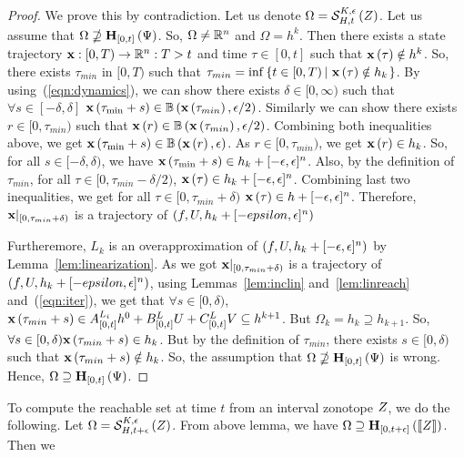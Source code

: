 \begin{proof}
We prove this by contradiction.  Let us denote $\Omega
= \mathcal{S}_{H,t}^{K,\epsilon}\left(Z\right)$.  Let us assume that
$\Omega\nsupseteq \mathbf{H}_{[0,t]}\left(\Psi\right)$.  So, $\Omega\neq\mathbb{R}^n$
and $\Omega = h^k$.  Then there exists a state trajectory
$\mathbf{x}:[0,T)\rightarrow\mathbb{R}^n:T>t$ and time $\tau\in[0,t]$ such
that $\mathbf{x}\left(\tau\right)\notin h^k$.  So, there exists $\tau_{min}$ in
$[0,T)$ such that $\tau_{min}
= \inf\left\{t\in[0,T)\left|~\mathbf{x}\left(\tau\right)\notin h_k\right.\right\}$.  By
using~(\ref{eqn:dynamics}), we can show there exists
$\delta\in[0,\infty)$ such that $\forall s\in[-\delta,\delta]$
$\mathbf{x}\left(\tau_{\min}+s\right)\in \mathbb{B}\left(\mathbf{x}\left(\tau_{min}\right),\epsilon/2\right)$.
Similarly we can show there exists $r\in[0,\tau_{min})$ such that
$\mathbf{x}\left(r\right)\in \mathbb{B}\left(\mathbf{x}\left(\tau_{min}\right),\epsilon/2\right)$.  Combining both
inequalities above, we get
$\mathbf{x}\left(\tau_{\min}+s\right)\in \mathbb{B}\left(\mathbf{x}\left(r\right),\epsilon\right)$.  As
$r\in[0,\tau_{min})$, we get $\mathbf{x}\left(r\right)\in h_k$.  So, for all
$s\in[-\delta,\delta)$, we have $\mathbf{x}\left(\tau_{\min}+s\right)\in h_k +
[-\epsilon,\epsilon]^n$.  Also, by the definition of $\tau_{min}$, for
all $\tau\in[0,\tau_{min}-\delta/2)$, $\mathbf{x}\left(\tau\right)\in h_k +
[-\epsilon,\epsilon]^n$. Combining last two inequalities, we get for
all $\tau\in[0,\tau_{min}+\delta)$ $\mathbf{x}\left(\tau\right)\in h +
[-\epsilon,\epsilon]^n$.  Therefore,
$\mathbf{x}|_{[0,\tau_{min}+\delta)}$ is a trajectory of
$\left(f,U,h_k+[-epsilon,\epsilon]^n\right)$

Furtheremore, $L_k$ is an overapproximation of
$\left(f,U,h_k+[-\epsilon,\epsilon]^n\right)$ by
Lemma~\ref{lem:linearization}.  As we got
$\mathbf{x}|_{[0,\tau_{min}+\delta)}$ is a trajectory of
$\left(f,U,h_k+[-epsilon,\epsilon]^n\right)$, using
Lemmas~\ref{lem:inclin} and~\ref{lem:linreach} and~(\ref{eqn:iter}),
we get that $\forall s\in [0,\delta)$,
$\mathbf{x}\left(\tau_{min}+s\right)\in {A}^{L_i}_{[0,t]}h^0
+ {B}^{L}_{[0,t]}U
+ {C}^{L}_{[0,t]}V \subseteq h^{k+1}$.  But
$\Omega_k=h_k\supseteq h_{k+1}$.  So, $\forall s\in
[0,\delta)\mathbf{x}\left(\tau_{min}+s\right)\in h_k$.  But by the definition of
$\tau_{min}$, there exists $s\in[0,\delta)$ such that
$\mathbf{x}\left(\tau_{min}+s\right)\notin h_k$.  So, the assumption that
$\Omega\nsupseteq \mathbf{H}_{[0,t]}\left(\Psi\right)$ is wrong.  Hence,
$\Omega\supseteq \mathbf{H}_{[0,t]}\left(\Psi\right)$.
\end{proof}
%
To compute the reachable set at time $t$ from an interval zonotope
$Z$, we do the following.  Let $\Omega
= \mathcal{S}_{H,t+\epsilon}^{K,\epsilon}\left(Z\right)$.  From above lemma, we
have $\Omega\supseteq\mathbf{H}_{[0,t+\epsilon]}\left(\left\llbracket{Z}\right\rrbracket\right)$.  Then we
